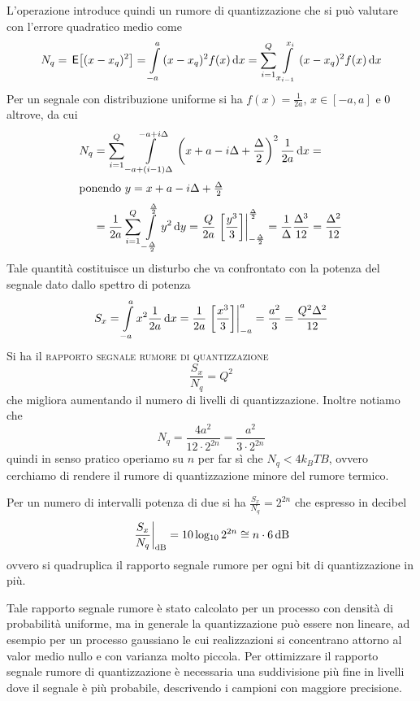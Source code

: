 L'operazione introduce quindi un rumore di quantizzazione che si può valutare con l'errore quadratico medio come
\[
	N_q=\E{(x-x_q)^2}=\intd{-a}{a}{(x-x_q)^2 f(x)}{x}=\sum_{i=1}^{Q}\intd{x_{i-1}}{x_i}{(x-x_q)^2 f(x)}{x}
\]
Per un segnale con distribuzione uniforme si ha $f(x)=\frac{1}{2a},\,x\in[-a,a]$ e 0 altrove, da cui
\[
	\begin{split}
		N_q&=\sum_{i=1}^{Q}\intd{-a+(i-1)\Delta}{-a+i\Delta}{\left(x+a-i\Delta+\frac{\Delta}{2}\right)^2 \frac{1}{2a}}{x}=\\\intertext{ponendo $y=x+a-i\Delta+\frac{\Delta}{2}$}&=\frac{1}{2a}\sum_{i=1}^{Q}\intd{-\frac{\Delta}{2}}{\frac{\Delta}{2}}{y^2}{y}=\frac{Q}{2a}\bound{-\frac{\Delta}{2}}{\frac{\Delta}{2}}{\frac{y^3}{3}}=\frac{1}{\Delta}\frac{\Delta^3}{12}=\frac{\Delta^2}{12}
	\end{split}
\]
Tale quantità costituisce un disturbo che va confrontato con la potenza del segnale dato dallo spettro di potenza
\[
	S_x=\intd{-a}{a}{x^2\frac{1}{2a}}{x}=\frac{1}{2a}\bound{-a}{a}{\frac{x^3}{3}}=\frac{a^2}{3}=\frac{Q^2\Delta^2}{12}
\]
Si ha il \textsc{rapporto segnale rumore di quantizzazione}
\begin{equation}
	\frac{S_x}{N_q}=Q^2
\end{equation}
che migliora aumentando il numero di livelli di quantizzazione.
Inoltre notiamo che
\[
	N_q = \frac{4a^2}{12\cdot2^{2n}} = \frac{a^2}{3\cdot2^{2n}}
\]
quindi in senso pratico operiamo su $n$ per far sì che $N_q < 4k_BTB$, ovvero cerchiamo di rendere il rumore di quantizzazione minore del rumore termico.

Per un numero di intervalli potenza di due si ha $\frac{S_x}{N_q}=2^{2n}$ che espresso in decibel
\[
	\restrict{\frac{S_x}{N_q}}{\text{dB}}=10\Log 2^{2n}\cong n\cdot\SI{6}{\decibel}
\]
ovvero si quadruplica il rapporto segnale rumore per ogni bit di quantizzazione in più.

Tale rapporto segnale rumore è stato calcolato per un processo con densità di probabilità uniforme, ma in generale la quantizzazione può essere non lineare, ad esempio per un processo gaussiano le cui realizzazioni si concentrano attorno al valor medio nullo e con varianza molto piccola. Per ottimizzare il rapporto segnale rumore di quantizzazione è necessaria una suddivisione più fine in livelli dove il segnale è più probabile, descrivendo i campioni con maggiore precisione.

